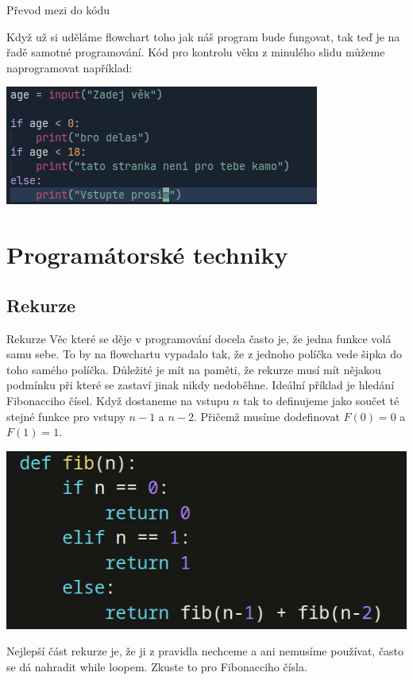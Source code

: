 \documentclass{beamer}
\begin{document}
 \begin{frame}{Převod mezi do kódu}

  Když už si uděláme flowchart toho jak náš program bude fungovat, tak teď je na
  řadě samotné programování. Kód pro kontrolu věku z minulého slidu můžeme
  naprogramovat například:

  \includegraphics[scale=0.5]{Screenshot_2025-02-12-17-18-37_1920x1080.png}
  
 \end{frame}

 \section{Programátorské techniky}
 \label{sec:programatorske-techniky}

 
\subsection{Rekurze}
\label{ssec:rekurze}


 \begin{frame}{Rekurze}
  Věc které se děje v programování docela často je, že jedna funkce volá samu
  sebe. To by na flowchartu vypadalo tak, že z jednoho políčka vede šipka do
  toho samého políčka. Důležité je mít na paměti, že rekurze musí mít nějakou
  podmínku při které se zastaví jinak nikdy nedoběhne.
\vfill
  Ideální příklad je hledání Fibonacciho čísel. Když dostaneme na vstupu $n$ tak
  to definujeme jako součet té stejné funkce pro vstupy $n-1$ a $n-2$. Přičemž
  musíme dodefinovat $F(0)=0$ a $F(1)=1$.

  \includegraphics[scale=0.35]{Screenshot_2025-02-11-20-13-03_1920x1080.png}

  Nejlepší část rekurze je, že ji z pravidla nechceme a ani nemusíme používat,
  často se dá nahradit while loopem. Zkuste to pro Fibonacciho čísla.
 \end{frame}
\end{document}
